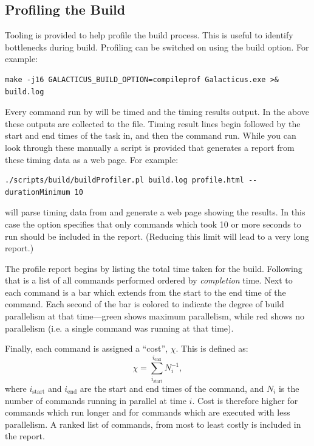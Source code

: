 \subsection{Profiling the Build}

Tooling is provided to help profile the build process. This is useful to identify bottlenecks during build. Profiling can be switched on using the  build option. For example:
\begin{verbatim}
make -j16 GALACTICUS_BUILD_OPTION=compileprof Galacticus.exe >& build.log
\end{verbatim}
Every command run by  will be timed and the timing results output. In the above these outputs are collected to the  file. Timing result lines begin  followed by the start and end times of the task in, and then the command run. While you can look through these manually a script is provided that generates a report from these timing data as a web page. For example:
\begin{verbatim}
./scripts/build/buildProfiler.pl build.log profile.html --durationMinimum 10
\end{verbatim}
will parse timing data from  and generate a web page  showing the results. In this case the  option specifies that only commands which took 10 or more seconds to run should be included in the report. (Reducing this limit will lead to a very long report.)

The profile report begins by listing the total time taken for the build. Following that is a list of all commands performed ordered by \emph{completion} time. Next to each command is a bar which extends from the start to the end time of the command. Each second of the bar is colored to indicate the degree of build parallelism at that time---green shows maximum parallelism, while red shows no parallelism (i.e. a single command was running at that time).

Finally, each command is assigned a ``cost'', $\chi$. This is defined as:
\begin{equation}
  \chi = \sum_{i_\mathrm{start}}^{i_\mathrm{end}} N_i^{-1},
\end{equation}
where $i_\mathrm{start}$ and $i_\mathrm{end}$ are the start and end times of the command, and $N_i$ is the number of commands running in parallel at time $i$. Cost is therefore higher for commands which run longer and for commands which are executed with less parallelism. A ranked list of commands, from most to least costly is included in the report.
